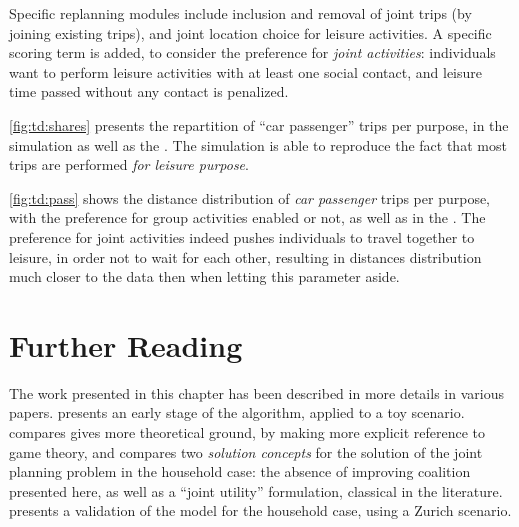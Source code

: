 {Specific replanning modules include inclusion and removal of joint trips (by joining existing trips),
and joint location choice for leisure activities.
A specific scoring term is added, to consider the preference for \emph{joint activities}:
individuals want to perform leisure activities with at least one social contact,
and leisure time passed without any contact is penalized.

\cref{fig:td:shares} presents the repartition of ``car passenger'' trips per purpose,
in the simulation as well as the \mz.
The simulation is able to reproduce the fact that most trips are performed
\emph{for leisure purpose}.


\cref{fig:td:pass} shows the distance distribution of \emph{car passenger} trips per purpose,
with the preference for group activities enabled or not, as well as in the \mz.
The preference for joint activities indeed pushes individuals to travel together to leisure,
in order not to wait for each other, resulting in distances distribution much closer to the
\mz data then when letting this parameter aside.


\section{Further Reading}
The work presented in this chapter has been described in more details in various papers.
presents an early stage of the algorithm, applied to a toy scenario.
compares gives more theoretical ground,
by making more explicit reference to game theory,
and compares two \emph{solution concepts} for
the solution of the joint planning problem in the household case:
the absence of improving coalition presented here,
as well as a ``joint utility'' formulation,
classical in the literature.
presents a validation of the model for the household case,
using a Zurich scenario.

} %
